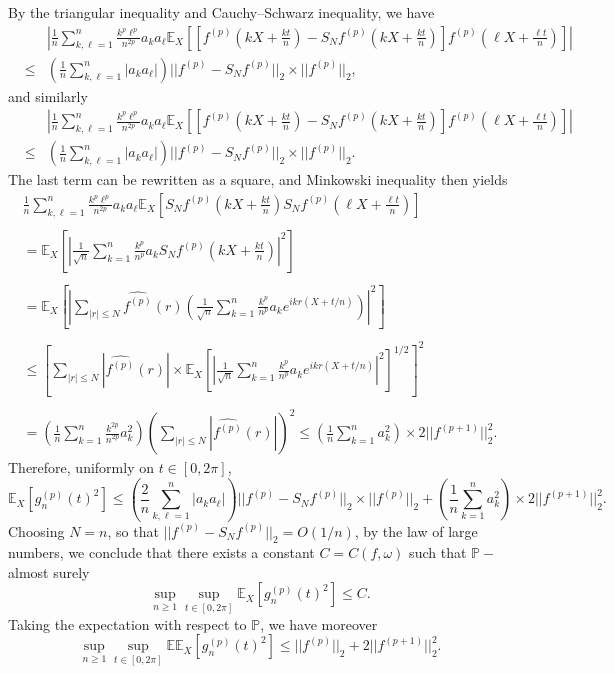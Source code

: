 \documentclass{svproc}
\begin{document}
By the triangular inequality and Cauchy--Schwarz inequality, we have
\begin{eqnarray*}
&&\left|  \frac{1}{n} \sum_{k, \ell=1}^n \frac{k^{p}\ell^{p}}{n^{2p}}a_k a_{\ell} \mathbb E_X \left[ \left[f^{(p)}\left(kX+\frac{kt}{n}\right)-S_N f^{(p)}\left(kX+\frac{kt}{n}\right) \right]f^{(p)}\left(\ell X+\frac{\ell t}{n}\right) \right] \right|\\
& \leq &\left(  \frac{1}{n} \sum_{k, \ell=1}^n |a_k a_{\ell} |\right) ||f^{(p)}-S_N  f^{(p)}||_2 \times ||f^{(p)}||_2, 
\end{eqnarray*}
and similarly 
\begin{eqnarray*}
&&\left| \frac{1}{n} \sum_{k, \ell=1}^n \frac{k^{p}\ell^{p}}{n^{2p}}a_k a_{\ell} \mathbb E_X \left[ \left[f^{(p)}\left(kX+\frac{kt}{n}\right)-S_N f^{(p)}\left(kX+\frac{kt}{n}\right) \right]f^{(p)}\left(\ell X+\frac{\ell t}{n}\right) \right]  \right|\\
& \leq &\left(  \frac{1}{n} \sum_{k, \ell=1}^n |a_k a_{\ell} |\right) ||f^{(p)}-S_N  f^{(p)}||_2 \times ||f^{(p)}||_2.
\end{eqnarray*}
The last term can be rewritten as a square, and Minkowski inequality then yields
\[
\begin{array}{l}
\displaystyle \frac{1}{n} \sum_{k, \ell=1}^n \frac{k^p\ell^p}{n^{2p}}a_k a_{\ell} \mathbb E_X \left[ S_N f^{(p)}\left(kX+\frac{kt}{n}\right) S_N f^{(p)}\left(\ell X+\frac{\ell t}{n}\right)\right] \\
\\
= \displaystyle{\mathbb E_X \left[ \left|\frac{1}{\sqrt{n}} \sum_{k=1}^n \frac{k^p}{n^{p}}a_k S_N f^{(p)} \left(kX+\frac{kt}{n}\right)\right|^2\right]} \\
\\
=  \displaystyle{ \mathbb E_X \left[ \left|\sum_{|r|\leq N} \widehat{f^{(p)}}(r) \left( \frac{1}{\sqrt{n}} \sum_{k=1}^n \frac{k^p}{n^p}a_k e^{i kr (X+t/n)}\right)\right|^2\right]} \\
\\
\leq \displaystyle{\left[ \sum_{|r|\leq N} |\widehat{f^{(p)}}(r)|  \times \mathbb E_X \left[ \left|  \frac{1}{\sqrt{n}} \sum_{k=1}^n \frac{k^p}{n^p}a_k e^{i kr (X+t/n)}\right|^2\right]^{1/2} \right]^2} \\
\\
 = \displaystyle{\left( \frac{1}{n} \sum_{k=1}^n \frac{k^{2p}}{n^{2p}}a_k^2\right) \left( \sum_{|r|\leq N} |\widehat{f^{(p)}}(r)| \right)^2 \leq \left( \frac{1}{n} \sum_{k=1}^n a_k^2\right) \times 2 || f^{(p+1)}||_2^2.}
\end{array}
\]
Therefore, uniformly on $t\in [0,2\pi]$,
\[
\mathbb E_X [g_n^{(p)}(t)^2] \leq \left(  \frac{2}{n} \sum_{k, \ell=1}^n |a_k a_{\ell} |\right) ||f^{(p)}-S_N  f^{(p)}||_2 \times ||f^{(p)}||_2 + \left( \frac{1}{n} \sum_{k=1}^n a_k^2\right) \times 2 || f^{(p+1)}||_2^2.
\]
Choosing $N=n$, so that $||f^{(p)}-S_N  f^{(p)}||_2  =O(1/n)$, by the law of large numbers, we conclude that there exists a constant $C=C(f,\omega)$ such that $\mathbb P-$almost surely 
\[
\sup_{n \geq 1} \sup_{t\in [0,2\pi]}\mathbb E_X [g_n^{(p)}(t)^2] \leq C.
\]
Taking the expectation with respect to $\mathbb P$, we have moreover 
\[
\sup_{n \geq 1} \sup_{t\in [0,2\pi]}\mathbb E \mathbb E_X [g_n^{(p)}(t)^2] \leq  ||f^{(p)}||_2 + 2 || f^{(p+1)}||_2^2.
\]






\end{document}
